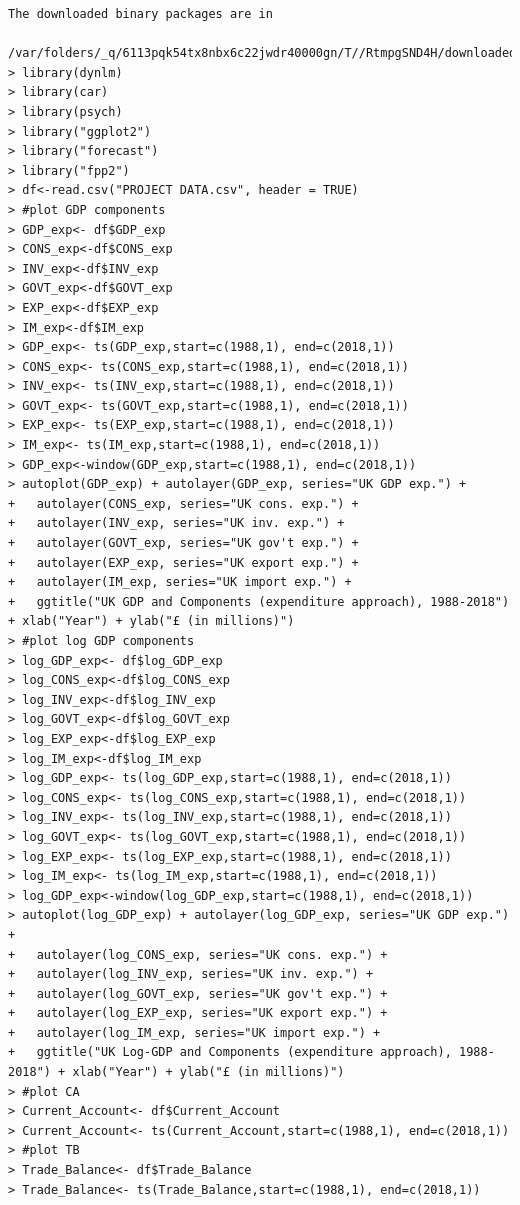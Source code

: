 \documentclass[12pt]{article}
\begin{document}
\begin{verbatim}
The downloaded binary packages are in
	/var/folders/_q/6113pqk54tx8nbx6c22jwdr40000gn/T//RtmpgSND4H/downloaded_packages
> library(dynlm)
> library(car)
> library(psych)
> library("ggplot2")
> library("forecast")
> library("fpp2")
> df<-read.csv("PROJECT DATA.csv", header = TRUE)
> #plot GDP components
> GDP_exp<- df$GDP_exp
> CONS_exp<-df$CONS_exp
> INV_exp<-df$INV_exp
> GOVT_exp<-df$GOVT_exp
> EXP_exp<-df$EXP_exp
> IM_exp<-df$IM_exp
> GDP_exp<- ts(GDP_exp,start=c(1988,1), end=c(2018,1))
> CONS_exp<- ts(CONS_exp,start=c(1988,1), end=c(2018,1))
> INV_exp<- ts(INV_exp,start=c(1988,1), end=c(2018,1))
> GOVT_exp<- ts(GOVT_exp,start=c(1988,1), end=c(2018,1))
> EXP_exp<- ts(EXP_exp,start=c(1988,1), end=c(2018,1))
> IM_exp<- ts(IM_exp,start=c(1988,1), end=c(2018,1))
> GDP_exp<-window(GDP_exp,start=c(1988,1), end=c(2018,1)) 
> autoplot(GDP_exp) + autolayer(GDP_exp, series="UK GDP exp.") +
+   autolayer(CONS_exp, series="UK cons. exp.") +
+   autolayer(INV_exp, series="UK inv. exp.") +
+   autolayer(GOVT_exp, series="UK gov't exp.") +
+   autolayer(EXP_exp, series="UK export exp.") +
+   autolayer(IM_exp, series="UK import exp.") +
+   ggtitle("UK GDP and Components (expenditure approach), 1988-2018") + xlab("Year") + ylab("£ (in millions)")
> #plot log GDP components
> log_GDP_exp<- df$log_GDP_exp
> log_CONS_exp<-df$log_CONS_exp
> log_INV_exp<-df$log_INV_exp
> log_GOVT_exp<-df$log_GOVT_exp
> log_EXP_exp<-df$log_EXP_exp
> log_IM_exp<-df$log_IM_exp
> log_GDP_exp<- ts(log_GDP_exp,start=c(1988,1), end=c(2018,1))
> log_CONS_exp<- ts(log_CONS_exp,start=c(1988,1), end=c(2018,1))
> log_INV_exp<- ts(log_INV_exp,start=c(1988,1), end=c(2018,1))
> log_GOVT_exp<- ts(log_GOVT_exp,start=c(1988,1), end=c(2018,1))
> log_EXP_exp<- ts(log_EXP_exp,start=c(1988,1), end=c(2018,1))
> log_IM_exp<- ts(log_IM_exp,start=c(1988,1), end=c(2018,1))
> log_GDP_exp<-window(log_GDP_exp,start=c(1988,1), end=c(2018,1)) 
> autoplot(log_GDP_exp) + autolayer(log_GDP_exp, series="UK GDP exp.") +
+   autolayer(log_CONS_exp, series="UK cons. exp.") +
+   autolayer(log_INV_exp, series="UK inv. exp.") +
+   autolayer(log_GOVT_exp, series="UK gov't exp.") +
+   autolayer(log_EXP_exp, series="UK export exp.") +
+   autolayer(log_IM_exp, series="UK import exp.") +
+   ggtitle("UK Log-GDP and Components (expenditure approach), 1988-2018") + xlab("Year") + ylab("£ (in millions)")
> #plot CA
> Current_Account<- df$Current_Account
> Current_Account<- ts(Current_Account,start=c(1988,1), end=c(2018,1))
> #plot TB
> Trade_Balance<- df$Trade_Balance
> Trade_Balance<- ts(Trade_Balance,start=c(1988,1), end=c(2018,1))

\end{verbatim}
\end{document}
